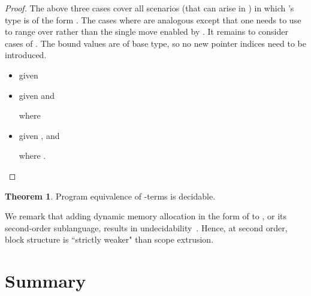 \documentclass{CSML}
\theoremstyle{definition}\newtheorem{definition}[thm]{Definition}
\theoremstyle{definition}\newtheorem{example}[thm]{Example}
\theoremstyle{definition}\newtheorem{proposition}[thm]{Proposition}
\theoremstyle{definition}\newtheorem{lemma}[thm]{Lemma}
\theoremstyle{definition}\newtheorem{theorem}[thm]{Theorem}
\theoremstyle{definition}\newtheorem{corollary}[thm]{Corollary}
\theoremstyle{definition}\newtheorem{remark}[thm]{Remark}
\newcommand\cutout[1]{}
\begin{document}
\begin{proof}
The above three cases cover all scenarios (that can arise in ) in which 's type 
is of the form .
The cases where  are analogous except that one needs to use  to range
over  rather than the single move enabled by .
It remains to consider cases of . The bound values are of base type, so  no new pointer indices need to be
introduced.
\begin{itemize}
\item 
given 

\item 
given  and 

where  
\item 
given ,  and 

where .\qedhere
\end{itemize}
\cutout{
For brevity, we shall write  instead of  whenever 
it is clear what  should be.
 can be decomposed as . Obviously 
is regular if, and only if, so is any of  (). Hence, it suffices to show
that  is regular for any relevant . The proof proceeds by induction on the structure of canonical forms.
The most difficult cases are those involving . Note that
whenever a canonical form of an -term is of the shape ,
's type must be of the form  (and  is a base type).
We handle this case below. Consider the terms:

Assuming that  and  satisfy the Proposition, we show that so does 
.
We shall refer to moves contributed by  with .
If we want to range solely over O- or P-moves from the component, we use  and  respectively.
Moreover, we use  to refer to copies of  in the  component.
The most common operation performed using this notation will be the relabelling of  to .
If  is a function type, then there is a unique P-question  enabled by the initial move .
Whenever we have a separate substitution rule for , the rule for  or  will not apply to .
In most cases we will want to substitute  ( decorated with index  represent a topmost binding) for .
In addition,  is used to increment all numerical indices by .
Then we have

where  and  ranges over .\qed}
\end{proof}
\begin{theorem}
Program equivalence of -terms is decidable.
\end{theorem}
We remark that adding dynamic memory allocation in the form of  to ,
or its second-order sublanguage, results in undecidability~\cite{Mur04b}. Hence,
at second order, block structure is ``strictly weaker" than scope extrusion.

\section{Summary}
\end{document}
